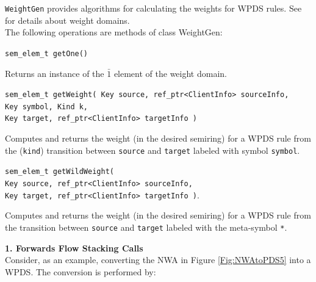 \documentclass{llncs}
\begin{document}
\texttt{WeightGen} provides algorithms for calculating the weights for WPDS rules.  See \cite[\S4-\S5]{wali} for details about weight domains. \\ 

\noindent The following operations are methods of class WeightGen:

\begin{description} 

  \item \texttt{sem\_elem\_t getOne()} 

    Returns an instance of the $\bar{1}$ element of the weight domain.

  \item \texttt{sem\_elem\_t getWeight( Key source, ref\_ptr<ClientInfo> sourceInfo, \\  
                              \hspace*{3.25cm} Key symbol, Kind k, \\
                              \hspace*{3.25cm} Key target, ref\_ptr<ClientInfo> targetInfo )} 

    Computes and returns the weight (in the desired semiring) for a WPDS rule from the (\texttt{kind}) transition between \texttt{source} and \texttt{target} labeled with symbol \texttt{symbol}.

  \item \texttt{sem\_elem\_t getWildWeight( \\
                              \hspace*{3.25cm} Key source, ref\_ptr<ClientInfo> sourceInfo, \\
                              \hspace*{3.25cm} Key target, ref\_ptr<ClientInfo> targetInfo )}. 

    Computes and returns the weight (in the desired semiring) for a WPDS rule from the transition between \texttt{source} and \texttt{target} labeled with the meta-symbol \texttt{*}. \\

\end{description}


\noindent \textbf{1. Forwards Flow Stacking Calls} \\

\noindent Consider, as an example, converting the NWA in Figure \ref{Fig:NWAtoPDS5} into a WPDS.  The conversion is performed by:
\end{document}
